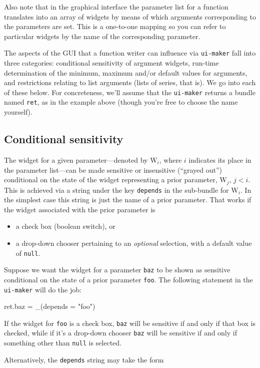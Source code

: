 \documentclass[oneside]{book}
\begin{document}
Also note that in the graphical interface the parameter list for a
function translates into an array of widgets by means of which
arguments corresponding to the parameters are set. This is a
one-to-one mapping so you can refer to particular widgets by the name
of the corresponding parameter.

The aspects of the GUI that a function writer can influence via
\texttt{ui-maker} fall into three categories: conditional sensitivity of
argument widgets, run-time determination of the minimum, maximum and/or
default values for arguments, and restrictions relating to list
arguments (lists of series, that is). We go into each of these
below. For concreteness, we'll assume that the \texttt{ui-maker} returns
a bundle named \texttt{ret}, as in the example above (though you're free
to choose the name yourself).

\subsection{Conditional sensitivity}

The widget for a given parameter---denoted by \textsf{W}$_i$, where $i$
indicates its place in the parameter list---can be made sensitive or
insensitive (``grayed out'') conditional on the state of the widget
representing a prior parameter, \textsf{W}$_j$, $j<i$. This is achieved
via a string under the key \texttt{depends} in the sub-bundle for
\textsf{W}$_i$.  In the simplest case this string is just the name of a
prior parameter. That works if the widget associated with the prior
parameter is
\begin{itemize}
\item a check box (boolean switch), or
\item a drop-down chooser pertaining to an \textit{optional} selection,
  with a default value of \texttt{null}.
\end{itemize}
Suppose we want the widget for a parameter \texttt{baz} to be shown as
sensitive conditional on the state of a prior parameter \texttt{foo}.
The following statement in the \texttt{ui-maker} will do the job:
\begin{code}
ret.baz = _(depends = "foo")
\end{code}
If the widget for \texttt{foo} is a check box, \texttt{baz} will be
sensitive if and only if that box is checked, while if it's a drop-down
chooser \texttt{baz} will be sensitive if and only if something other
than \texttt{null} is selected.

Alternatively, the \texttt{depends} string may take the form
\end{document}
